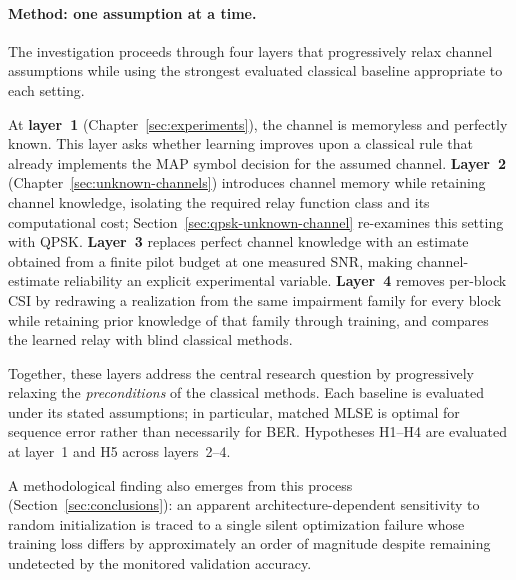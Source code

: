 \paragraph{Method: one assumption at a time.}
The investigation proceeds through four layers that progressively relax channel assumptions while using the strongest evaluated classical baseline appropriate to each setting.

At \textbf{layer~1} (Chapter~\ref{sec:experiments}), the channel is memoryless and perfectly known. This layer asks whether learning improves upon a classical rule that already implements the MAP symbol decision for the assumed channel. \textbf{Layer~2} (Chapter~\ref{sec:unknown-channels}) introduces channel memory while retaining channel knowledge, isolating the required relay function class and its computational cost; Section~\ref{sec:qpsk-unknown-channel} re-examines this setting with QPSK. \textbf{Layer~3} replaces perfect channel knowledge with an estimate obtained from a finite pilot budget at one measured SNR, making channel-estimate reliability an explicit experimental variable. \textbf{Layer~4} removes per-block CSI by redrawing a realization from the same impairment family for every block while retaining prior knowledge of that family through training, and compares the learned relay with blind classical methods.

Together, these layers address the central research question by progressively relaxing the \emph{preconditions} of the classical methods. Each baseline is evaluated under its stated assumptions; in particular, matched MLSE is optimal for sequence error rather than necessarily for BER. Hypotheses H1--H4 are evaluated at layer~1 and H5 across layers~2--4.

A methodological finding also emerges from this process (Section~\ref{sec:conclusions}): an apparent architecture-dependent sensitivity to random initialization is traced to a single silent optimization failure whose training loss differs by approximately an order of magnitude despite remaining undetected by the monitored validation accuracy.

